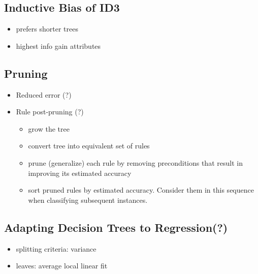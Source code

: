 \documentclass[11pt]{article}
\begin{document}
\subsection{Inductive Bias of ID3}
\begin{itemize}
\item prefers shorter trees
\item highest info gain attributes
\end{itemize}

\subsection{Pruning}
\begin{itemize}
\item Reduced error  (?)
\item Rule post-pruning (?)
\begin{itemize}
\item grow the tree
\item convert tree into equivalent set of rules
\item prune (generalize) each rule by removing preconditions that result in improving its estimated accuracy
\item sort pruned rules by estimated accuracy. Consider them in this sequence when classifying subsequent instances.
\end{itemize}
\end{itemize}

\subsection{Adapting Decision Trees to Regression(?)}
\begin{itemize}
\item splitting criteria: variance
\item leaves: average local linear fit
\end{itemize}
\end{document}
